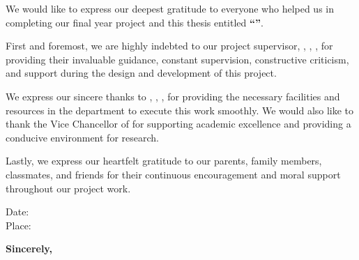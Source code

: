 {
\fontsize{12}{14}\selectfont
\noindent
We would like to express our deepest gratitude to everyone who helped us in completing our final year project and this thesis entitled \textbf{``\thesisTitle''}.

First and foremost, we are highly indebted to our project supervisor, \textbf{\supervisorName}, \supervisorDesignation, \supervisorDepartment, for providing their invaluable guidance, constant supervision, constructive criticism, and support during the design and development of this project.

We express our sincere thanks to \textbf{\hodName}, \hodDesignation, \hodDepartment, for providing the necessary facilities and resources in the department to execute this work smoothly. We would also like to thank the Vice Chancellor of \textbf{\university} for supporting academic excellence and providing a conducive environment for research.

Lastly, we express our heartfelt gratitude to our parents, family members, classmates, and friends for their continuous encouragement and moral support throughout our project work.

\vspace{2cm}
\noindent
\begin{minipage}[t]{0.30\textwidth}
    \begin{flushleft}
        Date: \\
        Place: 
    \end{flushleft}
\end{minipage}%
\hfill 
\begin{minipage}[t]{0.50\textwidth}
    \begin{flushright}
    \raggedright
            \textbf{Sincerely,}\\
            \ifdefempty{\authorA}{}{\authorA\\}
            \ifdefempty{\authorB}{}{\authorB\\}
            \ifdefempty{\authorC}{}{\authorC\\}
            \ifdefempty{\authorD}{}{\authorD\\}
    \end{flushright}
\end{minipage}
} 
